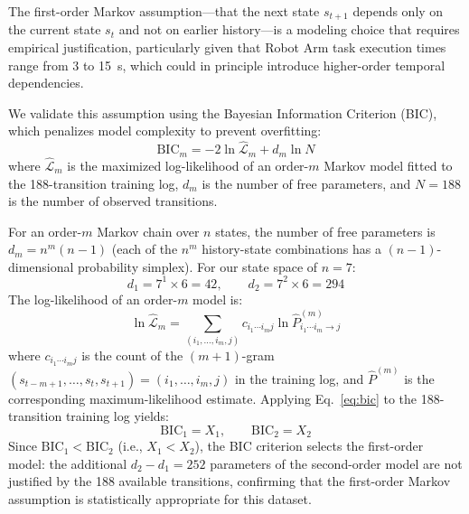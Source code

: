 \documentclass[manuscript,screen,review]{acmart}
\begin{document}
\begin{remark}
\label{rem:markov_order}
The first-order Markov assumption---that the next state
$s_{t+1}$ depends only on the current state $s_t$ and
not on earlier history---is a modeling choice that requires
empirical justification, particularly given that Robot Arm
task execution times range from 3 to 15~s, which could
in principle introduce higher-order temporal dependencies.

We validate this assumption using the Bayesian Information
Criterion (BIC), which penalizes model complexity to prevent
overfitting:
\begin{equation}
\mathrm{BIC}_m = -2\ln\hat{\mathcal{L}}_m + d_m \ln N
\label{eq:bic}
\end{equation}
where $\hat{\mathcal{L}}_m$ is the maximized log-likelihood
of an order-$m$ Markov model fitted to the 188-transition
training log, $d_m$ is the number of free parameters, and
$N = 188$ is the number of observed transitions.

For an order-$m$ Markov chain over $n$ states, the number
of free parameters is $d_m = n^m(n-1)$ (each of the $n^m$
history-state combinations has a $(n-1)$-dimensional
probability simplex). For our state space of $n = 7$:
\begin{equation}
d_1 = 7^1 \times 6 = 42, \qquad
d_2 = 7^2 \times 6 = 294
\label{eq:dof}
\end{equation}
The log-likelihood of an order-$m$ model is:
\begin{equation}
\ln\hat{\mathcal{L}}_m =
\sum_{(i_1,\ldots,i_m,j)} c_{i_1\cdots i_m j}
\ln \hat{P}^{(m)}_{i_1\cdots i_m \to j}
\label{eq:loglik}
\end{equation}
where $c_{i_1\cdots i_m j}$ is the count of the
$(m+1)$-gram $(s_{t-m+1}, \ldots, s_t, s_{t+1})
= (i_1, \ldots, i_m, j)$ in the training log, and
$\hat{P}^{(m)}$ is the corresponding maximum-likelihood
estimate. Applying Eq.~\eqref{eq:bic} to the
188-transition training log yields:
\begin{equation}
\mathrm{BIC}_1 = X_1, \qquad \mathrm{BIC}_2 = X_2
\label{eq:bic_values}
\end{equation}
Since $\mathrm{BIC}_1 < \mathrm{BIC}_2$ (i.e.,
$X_1 < X_2$), the BIC criterion selects the first-order
model: the additional $d_2 - d_1 = 252$ parameters of
the second-order model are not justified by the 188
available transitions, confirming that the first-order
Markov assumption is statistically appropriate for
this dataset.


\end{remark}
\end{document}
